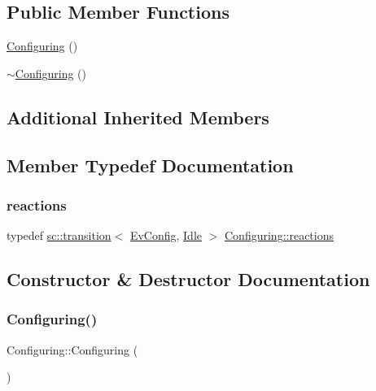 \subsection*{Public Member Functions}
\begin{DoxyCompactItemize}
\item 
\mbox{\hyperlink{struct_configuring_a9a845d239f3d62e198ef2911b2b55f3b}{Configuring}} ()
\item 
\mbox{\hyperlink{struct_configuring_a80ac4ce0d8593f56e3dd58a469fc8149}{$\sim$\+Configuring}} ()
\end{DoxyCompactItemize}
\subsection*{Additional Inherited Members}


\subsection{Member Typedef Documentation}
\mbox{\label{struct_configuring_a93222b59f6f021c31de6c611549df0f8}} 
\subsubsection{\texorpdfstring{reactions}{reactions}}
{\footnotesize\ttfamily typedef \mbox{\hyperlink{classboost_1_1statechart_1_1transition}{sc\+::transition}}$<$ \mbox{\hyperlink{struct_ev_config}{Ev\+Config}}, \mbox{\hyperlink{struct_idle}{Idle}} $>$ \mbox{\hyperlink{struct_configuring_a93222b59f6f021c31de6c611549df0f8}{Configuring\+::reactions}}}



\subsection{Constructor \& Destructor Documentation}
\mbox{\label{struct_configuring_a9a845d239f3d62e198ef2911b2b55f3b}} 
\subsubsection{\texorpdfstring{Configuring()}{Configuring()}}
{\footnotesize\ttfamily Configuring\+::\+Configuring (\begin{DoxyParamCaption}{ }\end{DoxyParamCaption})}

